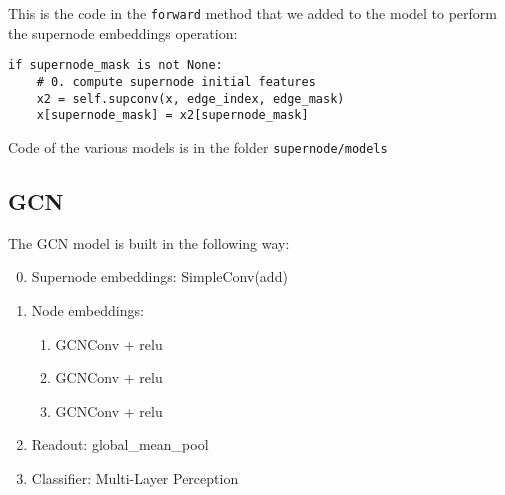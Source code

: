 \documentclass{article}
\begin{document}
    \noindent
    This is the code in the \texttt{forward} method that we added to the model to perform the supernode embeddings operation:

    \begin{code}
        \noindent
        \begin{lstlisting}
if supernode_mask is not None:
    # 0. compute supernode initial features
    x2 = self.supconv(x, edge_index, edge_mask)
    x[supernode_mask] = x2[supernode_mask]
        \end{lstlisting}
    \end{code}

    \begin{remark}
        Code of the various models is in the folder \texttt{supernode/models}
    \end{remark}

    \subsection{GCN}
    \begin{definition}
        The GCN model is built in the following way:
        \begin{enumerate}
        \setcounter{enumi}{-1}
            \item Supernode embeddings: SimpleConv(add)
            \item Node embeddings:
                \begin{enumerate}
                    \item GCNConv + relu
                    \item GCNConv + relu
                    \item GCNConv + relu
                \end{enumerate}
            \item Readout: global\_mean\_pool
            \item Classifier: Multi-Layer Perception
        \end{enumerate}
    \end{definition}
\end{document}
